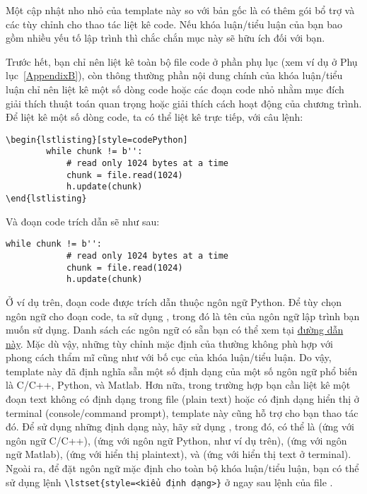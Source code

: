 Một cập nhật nho nhỏ của template này so với bản gốc là có thêm gói bổ trợ  và các tùy chỉnh cho thao tác liệt kê code. Nếu khóa luận/tiểu luận của bạn bao gồm nhiều yếu tố lập trình thì chắc chắn mục này sẽ hữu ích đối với bạn.

Trước hết, bạn chỉ nên liệt kê toàn bộ file code ở phần phụ lục (xem ví dụ ở Phụ lục~\ref{AppendixB}), còn thông thường phần nội dung chính của khóa luận/tiểu luận chỉ nên liệt kê một số dòng code hoặc các đoạn code nhỏ nhằm mục đích giải thích thuật toán quan trọng hoặc giải thích cách hoạt động của chương trình. Để liệt kê một số dòng code, ta có thể liệt kê trực tiếp, với câu lệnh:
\begin{Verbatim}
\begin{lstlisting}[style=codePython]
		while chunk != b'':
			# read only 1024 bytes at a time
			chunk = file.read(1024)
			h.update(chunk)
\end{lstlisting}
\end{Verbatim}

Và đoạn code trích dẫn sẽ như sau:
\begin{lstlisting}[style=codePython]
		while chunk != b'':
			# read only 1024 bytes at a time
			chunk = file.read(1024)
			h.update(chunk)
\end{lstlisting}

Ở ví dụ trên, đoạn code được trích dẫn thuộc ngôn ngữ Python. Để tùy chọn ngôn ngữ cho đoạn code, ta sử dụng , trong đó  là tên của ngôn ngữ lập trình bạn muốn sử dụng. Danh sách các ngôn ngữ có sẵn bạn có thể xem tại \href{https://en.wikibooks.org/wiki/LaTeX/Source_Code_Listings#Supported_languages}{đường dẫn này}. Mặc dù vậy, những tùy chỉnh mặc định của  thường không phù hợp với phong cách thẩm mĩ cũng như với bố cục của khóa luận/tiểu luận. Do vậy, template này đã định nghĩa sẵn một số định dạng của một số ngôn ngữ phổ biến là C/C++, Python, và Matlab. Hơn nữa, trong trường hợp bạn cần liệt kê một đoạn text không có định dạng trong file (plain text) hoặc có định dạng hiển thị ở terminal (console/command prompt), template này cũng hỗ trợ cho bạn thao tác đó. Để sử dụng những định dạng này, hãy sử dụng , trong đó,  có thể là  (ứng với ngôn ngữ C/C++),  (ứng với ngôn ngữ Python, như ví dụ trên),  (ứng với ngôn ngữ Matlab),  (ứng với hiển thị plaintext), và  (ứng với hiển thị text ở terminal). Ngoài ra, để đặt ngôn ngữ mặc định cho toàn bộ khóa luận/tiểu luận, bạn có thể sử dụng lệnh \verb|\lstset{style=<kiểu định dạng>}| ở ngay sau lệnh \verb|| của file .
	
